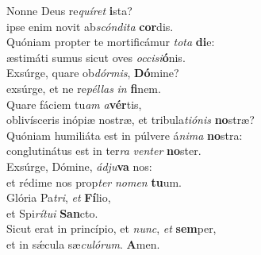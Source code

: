 \evenverse Nonne Deus re\textit{quí}\textit{ret} \textbf{i}sta?~\*\\
\evenverse ipse enim novit ab\textit{scón}\textit{di}\textit{ta} \textbf{cor}dis.\\
\oddverse Quóniam propter te mortificámur \textit{to}\textit{ta} \textbf{di}e:~\*\\
\oddverse æstimáti sumus sicut oves \textit{oc}\textit{ci}\textit{si}\textbf{ó}nis.\\
\evenverse Exsúrge, quare ob\textit{dór}\textit{mis}, \textbf{Dó}mine?~\*\\
\evenverse exsúrge, et ne re\textit{pél}\textit{las} \textit{in} \textbf{fi}nem.\\
\oddverse Quare fáciem tu\textit{am} \textit{a}\textbf{vér}tis,~\*\\
\oddverse oblivísceris inópiæ nostræ, et tribula\textit{ti}\textit{ó}\textit{nis} \textbf{no}stræ?\\
\evenverse Quóniam humiliáta est in púlvere á\textit{ni}\textit{ma} \textbf{no}stra:~\*\\
\evenverse conglutinátus est in ter\textit{ra} \textit{ven}\textit{ter} \textbf{no}ster.\\
\oddverse Exsúrge, Dómine, \textit{ád}\textit{ju}\textbf{va} nos:~\*\\
\oddverse et rédime nos prop\textit{ter} \textit{no}\textit{men} \textbf{tu}um.\\
\evenverse Glória Pa\textit{tri}, \textit{et} \textbf{Fí}lio,~\*\\
\evenverse et Spi\textit{rí}\textit{tu}\textit{i} \textbf{San}cto.\\
\oddverse Sicut erat in princípio, et \textit{nunc}, \textit{et} \textbf{sem}per,~\*\\
\oddverse et in sǽcula sæ\textit{cu}\textit{ló}\textit{rum}. \textbf{A}men.\\
